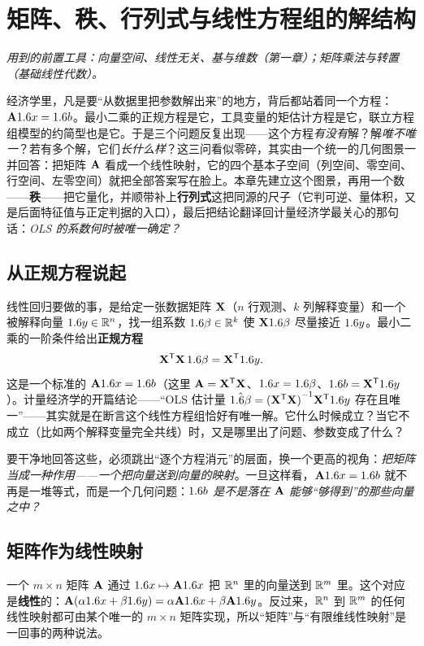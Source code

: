 \chapter{矩阵、秩、行列式与线性方程组的解结构}
\label{ch:rank}

\noindent\emph{用到的前置工具：向量空间、线性无关、基与维数（第一章）；矩阵乘法与转置（基础线性代数）。}
\medskip

经济学里，凡是要``从数据里把参数解出来''的地方，背后都站着同一个方程：$\mathbf{A}1.6 x=1.6 b$。最小二乘的正规方程是它，工具变量的矩估计方程是它，联立方程组模型的约简型也是它。于是三个问题反复出现——这个方程\emph{有没有}解？解\emph{唯不唯一}？若有多个解，它们\emph{长什么样}？这三问看似零碎，其实由一个统一的几何图景一并回答：把矩阵 $\mathbf{A}$ 看成一个线性映射，它的四个基本子空间（列空间、零空间、行空间、左零空间）就把全部答案写在脸上。本章先建立这个图景，再用一个数——\textbf{秩}——把它量化，并顺带补上\textbf{行列式}这把同源的尺子（它判可逆、量体积，又是后面特征值与正定判据的入口），最后把结论翻译回计量经济学最关心的那句话：\emph{OLS 的系数何时被唯一确定？}

\section{从正规方程说起}
\label{sec:rank-1}

线性回归要做的事，是给定一张数据矩阵 $\mathbf{X}$（$n$ 行观测、$k$ 列解释变量）和一个被解释向量 $1.6 y\in\mathbb{R}^n$，找一组系数 $1.6\beta\in\mathbb{R}^k$ 使 $\mathbf{X}1.6\beta$ 尽量接近 $1.6 y$。最小二乘的一阶条件给出\textbf{正规方程}
\[
    \mathbf{X}^{\mathsf{T}}\mathbf{X}\,1.6\beta=\mathbf{X}^{\mathsf{T}}1.6 y .
\]
这是一个标准的 $\mathbf{A}1.6 x=1.6 b$（这里 $\mathbf{A}=\mathbf{X}^{\mathsf{T}}\mathbf{X}$、$1.6 x=1.6\beta$、$1.6 b=\mathbf{X}^{\mathsf{T}}1.6 y$）。计量经济学的开篇结论——``OLS 估计量 $\hat{1.6\beta}={(\mathbf{X}^{\mathsf{T}}\mathbf{X})}^{-1}\mathbf{X}^{\mathsf{T}}1.6 y$ 存在且唯一''——其实就是在断言这个线性方程组恰好有唯一解。它什么时候成立？当它不成立（比如两个解释变量完全共线）时，又是哪里出了问题、参数变成了什么？

要干净地回答这些，必须跳出``逐个方程消元''的层面，换一个更高的视角：\emph{把矩阵当成一种作用——一个把向量送到向量的映射}。一旦这样看，$\mathbf{A}1.6 x=1.6 b$ 就不再是一堆等式，而是一个几何问题：\emph{$1.6 b$ 是不是落在 $\mathbf{A}$ 能够``够得到''的那些向量之中？}

\section{矩阵作为线性映射}
\label{sec:rank-2}

一个 $m\times n$ 矩阵 $\mathbf{A}$ 通过 $1.6 x\mapsto\mathbf{A}1.6 x$ 把 $\mathbb{R}^n$ 里的向量送到 $\mathbb{R}^m$ 里。这个对应是\textbf{线性}的：$\mathbf{A}(\alpha1.6 x+\beta1.6 y)=\alpha\mathbf{A}1.6 x+\beta\mathbf{A}1.6 y$。反过来，$\mathbb{R}^n$ 到 $\mathbb{R}^m$ 的任何线性映射都可由某个唯一的 $m\times n$ 矩阵实现，所以``矩阵''与``有限维线性映射''是一回事的两种说法。

